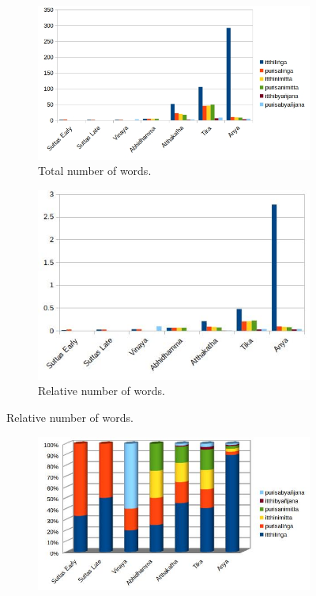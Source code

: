 \begin{figure}[!h]
  \begin{subfigure}{0.551\linewidth}
    \includegraphics[width=\linewidth]{itthi.jpg}
    \caption{Total number of words.}
  \end{subfigure}
  \hfill
  \begin{subfigure}{0.449\linewidth}
    \includegraphics[width=\linewidth]{itthi_weighted.jpg}
    \caption{Relative number of words.}
  \end{subfigure}
\setcounter{figure}{10}
\label{itthi}
\end{figure}

\begin{figure}[!h]
  \begin{subfigure}{\linewidth}
  \begin{center}
    \includegraphics[width=0.38\linewidth]{itthi_perc.jpg}
  \end{center}
  \end{subfigure}
\setcounter{figure}{11}
\label{itthi2}
\end{figure}

